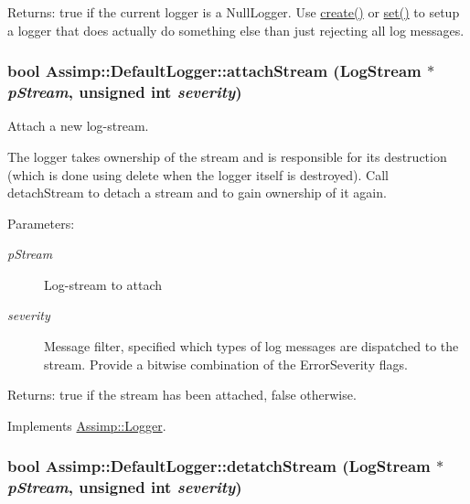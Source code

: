 \begin{Desc}
\item[Returns:]true if the current logger is a NullLogger. Use \hyperlink{class_assimp_1_1_default_logger_dccb11f85f8b0ef226c382e11ba665c3}{create()} or \hyperlink{class_assimp_1_1_default_logger_9daba548026045b99813c760c2842ed2}{set()} to setup a logger that does actually do something else than just rejecting all log messages. \end{Desc}
\hypertarget{class_assimp_1_1_default_logger_bc0ca7a337f8c3e38eca0eb45bb1ccf0}{
\subsubsection[attachStream]{\setlength{\rightskip}{0pt plus 5cm}bool Assimp::DefaultLogger::attachStream ({\bf LogStream} $\ast$ {\em pStream}, \/  unsigned int {\em severity})}}
\label{class_assimp_1_1_default_logger_bc0ca7a337f8c3e38eca0eb45bb1ccf0}


Attach a new log-stream. 

The logger takes ownership of the stream and is responsible for its destruction (which is done using delete when the logger itself is destroyed). Call detachStream to detach a stream and to gain ownership of it again. \begin{Desc}
\item[Parameters:]
\begin{description}
\item[{\em pStream}]Log-stream to attach \item[{\em severity}]Message filter, specified which types of log messages are dispatched to the stream. Provide a bitwise combination of the ErrorSeverity flags. \end{description}
\end{Desc}
\begin{Desc}
\item[Returns:]true if the stream has been attached, false otherwise. \end{Desc}
 

Implements \hyperlink{class_assimp_1_1_logger_af32a42b02a7e227076013d01e349871}{Assimp::Logger}.\hypertarget{class_assimp_1_1_default_logger_2615f1d1624f1d742d0cf2dd4a5cccc8}{
\subsubsection[detatchStream]{\setlength{\rightskip}{0pt plus 5cm}bool Assimp::DefaultLogger::detatchStream ({\bf LogStream} $\ast$ {\em pStream}, \/  unsigned int {\em severity})}}
\label{class_assimp_1_1_default_logger_2615f1d1624f1d742d0cf2dd4a5cccc8}


